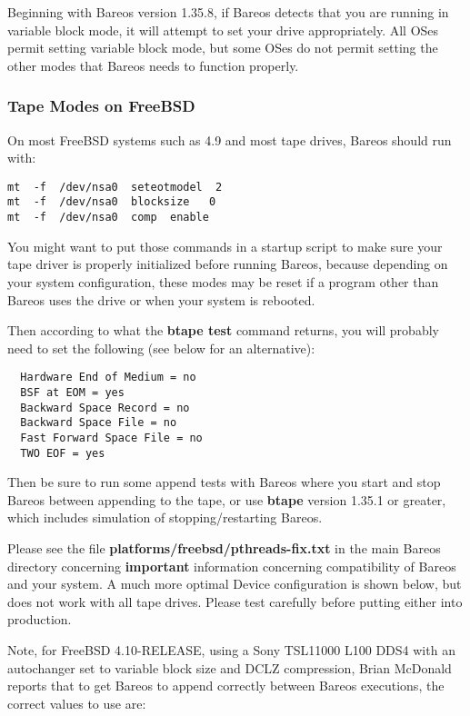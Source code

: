 {Beginning with Bareos version 1.35.8, if Bareos detects that you are running
in variable block mode, it will attempt to set your drive appropriately. All
OSes permit setting variable block mode, but some OSes do not permit setting
the other modes that Bareos needs to function properly.


\subsubsection{Tape Modes on FreeBSD}
\label{FreeBSDTapes}

On most FreeBSD systems such as 4.9 and most tape drives, Bareos should run
with:

\footnotesize
\begin{verbatim}
mt  -f  /dev/nsa0  seteotmodel  2
mt  -f  /dev/nsa0  blocksize   0
mt  -f  /dev/nsa0  comp  enable
\end{verbatim}
\normalsize

You might want to put those commands in a startup script to make sure your
tape driver is properly initialized before running Bareos, because
depending on your system configuration, these modes may be reset if a
program other than Bareos uses the drive or when your system is rebooted.

Then according to what the {\bf btape test} command returns, you will probably
need to set the following (see below for an alternative):

\footnotesize
\begin{verbatim}
  Hardware End of Medium = no
  BSF at EOM = yes
  Backward Space Record = no
  Backward Space File = no
  Fast Forward Space File = no
  TWO EOF = yes
\end{verbatim}
\normalsize

Then be sure to run some append tests with Bareos where you start and stop
Bareos between appending to the tape, or use {\bf btape} version 1.35.1 or
greater, which includes simulation of stopping/restarting Bareos.

Please see the file {\bf platforms/freebsd/pthreads-fix.txt} in the main
Bareos directory concerning {\bf important} information concerning
compatibility of Bareos and your system. A much more optimal Device
configuration is shown below, but does not work with all tape drives. Please
test carefully before putting either into production.

Note, for FreeBSD 4.10-RELEASE, using a Sony TSL11000 L100 DDS4 with an
autochanger set to variable block size and DCLZ compression, Brian McDonald
reports that to get Bareos to append correctly between Bareos executions,
the correct values to use are:

}
